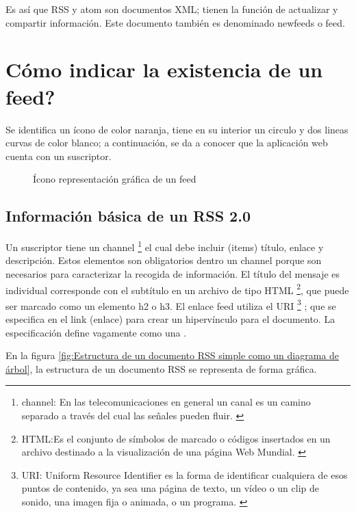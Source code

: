 Es así que RSS y atom son documentos XML; tienen la función de actualizar y
compartir información. Este documento también es denominado newfeeds o feed.
\cite{wittenbrink2005rss}

\section{\textquestiondown Cómo indicar la existencia de un feed?}

Se identifica un ícono de color naranja, tiene en su interior un circulo y
dos lineas curvas de color blanco; a continuación, se da a conocer que la
aplicación web cuenta con un suscriptor.

\begin{figure}[h!]
\centering
		\caption{Ícono representación gráfica de un feed}
	\label{fig:Ícono representación gráfica de un feed}
\end{figure}

\subsection{Información básica de un RSS 2.0}

Un suscriptor tiene un channel \footnote{channel: En las telecomunicaciones
en general un canal es un camino separado a través del cual las señales pueden
fluir. \cite{channel}} el cual debe incluir (items) título, enlace y
descripción. Estos elementos son obligatorios dentro un channel porque son
necesarios para caracterizar la recogida de información. El título del mensaje
es individual corresponde con el subtítulo en un archivo de tipo HTML 
\footnote{HTML:Es el conjunto de símbolos de marcado o códigos insertados en
un archivo destinado a la visualización de una página Web Mundial. \cite{html}},
que puede ser marcado como un elemento h2 o h3. El enlace feed utiliza el URI
\footnote{URI: Uniform Resource Identifier es la forma de identificar
cualquiera de esos puntos de contenido, ya sea una página de texto, un vídeo
o un clip de sonido, una imagen fija o animada, o un programa. \cite{uri}}
; que se especifica en el link (enlace) para crear un hipervínculo para el
documento. La especificación define vagamente como una . \cite{wittenbrink2005rss}

En la figura \ref{fig:Estructura de un documento RSS simple como un diagrama de árbol},
la estructura de un documento RSS se representa de forma gráfica.


